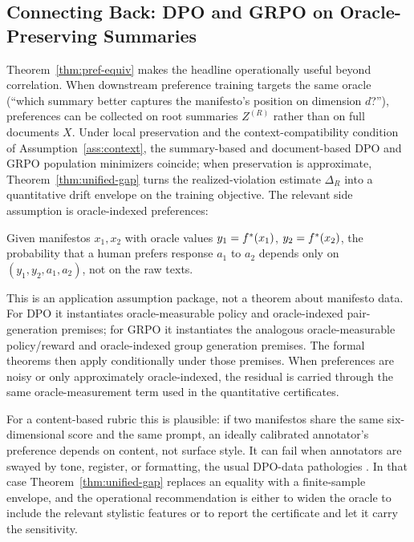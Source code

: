 \subsection{Connecting Back: DPO and GRPO on Oracle-Preserving Summaries}

Theorem~\ref{thm:pref-equiv} makes the headline operationally useful
beyond correlation. When downstream preference training targets the
same oracle (``which summary better captures the manifesto's
position on dimension $d$?''), preferences can be collected on root
summaries $Z^{(R)}$ rather than on full documents $X$. Under local
preservation and the context-compatibility condition of
Assumption~\ref{ass:context}, the summary-based and
document-based DPO and GRPO population minimizers coincide; when
preservation is approximate, Theorem~\ref{thm:unified-gap} turns the
realized-violation estimate $\Delta_R$ into a quantitative drift
envelope on the training objective. The relevant side assumption is
oracle-indexed preferences:

\begin{assumption}\label{ass:pref}
Given manifestos $x_1, x_2$ with oracle values
$y_1 = f^\ast(x_1)$, $y_2 = f^\ast(x_2)$, the probability that a human
prefers response $a_1$ to $a_2$ depends only on $(y_1, y_2, a_1, a_2)$,
not on the raw texts.
\end{assumption}

This is an application assumption package, not a theorem about manifesto
data. For DPO it instantiates oracle-measurable policy and
oracle-indexed pair-generation premises; for GRPO it instantiates the
analogous oracle-measurable policy/reward and oracle-indexed group
generation premises. The formal theorems then apply conditionally under
those premises. When preferences are noisy or only approximately
oracle-indexed, the residual is carried through the same
oracle-measurement term used in the quantitative certificates.

For a content-based rubric this is plausible: if two manifestos share
the same six-dimensional score and the same prompt, an ideally
calibrated annotator's preference depends on content, not surface
style. It can fail when annotators are swayed by tone, register, or
formatting, the usual DPO-data pathologies \citep{RafailovEtAl2023DPO}.
In that case Theorem~\ref{thm:unified-gap} replaces an equality with a
finite-sample envelope, and the operational recommendation is either
to widen the oracle to include the relevant stylistic features or to
report the certificate and let it carry the sensitivity.

